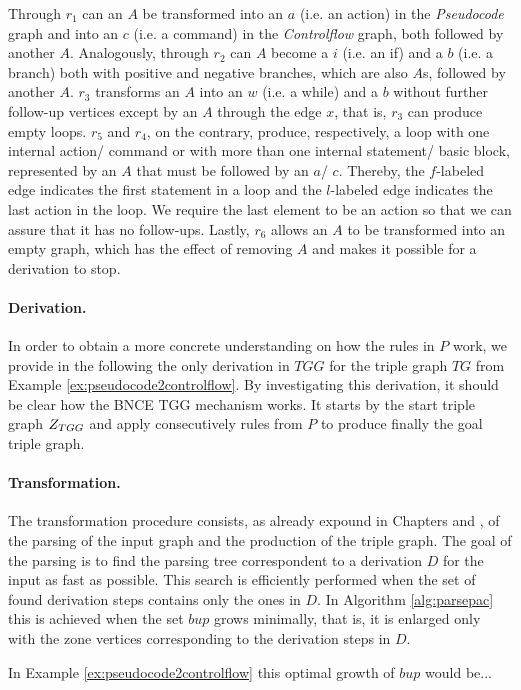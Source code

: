 Through $r_1$ can an $A$ be transformed into an $a$ (i.e. an action) in the \emph{Pseudocode} graph and into an $c$ (i.e. a command) in the \emph{Controlflow} graph, both followed by another $A$. Analogously, through $r_2$ can $A$ become a $i$ (i.e. an if) and a $b$ (i.e. a branch) both with positive and negative branches, which are also $A$s, followed by another $A$. $r_3$ transforms an $A$ into an $w$ (i.e. a while) and a $b$ without further follow-up vertices except by an $A$ through the edge $x$, that is, $r_3$ can produce empty loops. $r_5$ and $r_4$, on the contrary, produce, respectively, a loop with one internal action/ command or with more than one internal statement/ basic block, represented by an $A$ that must be followed by an $a$/ $c$. Thereby, the $f$-labeled edge indicates the first statement in a loop and the $l$-labeled edge indicates the last action in the loop. We require the last element to be an action so that we can assure that it has no follow-ups. Lastly, $r_6$ allows an $A$ to be transformed into an empty graph, which has the effect of removing $A$ and makes it possible for a derivation to stop.

\paragraph*{Derivation. } In order to obtain a more concrete understanding on how the rules in $P$ work, we provide in the following the only derivation in $TGG$ for the triple graph $TG$ from Example \ref{ex:pseudocode2controlflow}. By investigating this derivation, it should be clear how the BNCE TGG mechanism works. It starts by the start triple graph $Z_{TGG}$ and apply consecutively rules from $P$ to produce finally the goal triple graph.



\paragraph*{Transformation. } The transformation procedure consists, as already expound in Chapters \label{ch:ModelTransformation} \label{ch:PacExtension} and \label{ch:Implementation}, of the parsing of the input graph and the production of the triple graph. The goal of the parsing is to find the parsing tree correspondent to a derivation $D$ for the input as fast as possible. This search is efficiently performed when the set of found derivation steps contains only the ones in $D$. In Algorithm \ref{alg:parsepac} this is achieved when the set $bup$ grows minimally, that is, it is enlarged only with the zone vertices corresponding to the derivation steps in $D$.

In Example \ref{ex:pseudocode2controlflow} this optimal growth of $bup$ would be...


